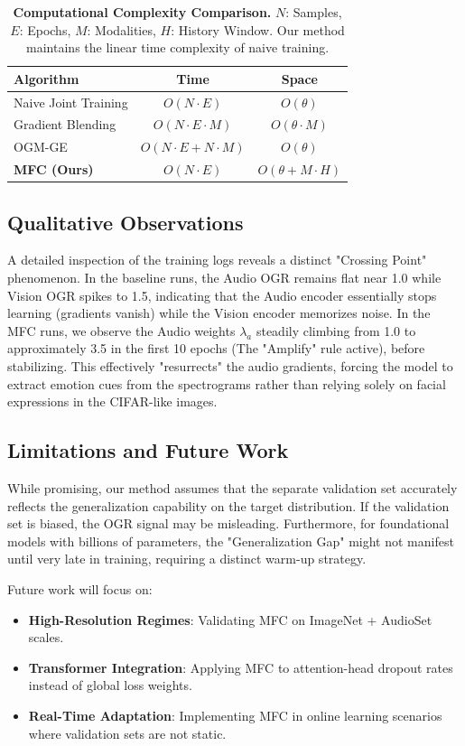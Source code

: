 \documentclass[10pt, twocolumn, letterpaper]{article}
\begin{document}
\begin{table}[h]
\centering
\begin{tabularx}{\columnwidth}{@{}Xcc@{}}
\toprule
\textbf{Algorithm} & \textbf{Time} & \textbf{Space} \\ \midrule
Naive Joint Training & $O(N \cdot E)$ & $O(\theta)$ \\
Gradient Blending & $O(N \cdot E \cdot M)$ & $O(\theta \cdot M)$ \\
OGM-GE & $O(N \cdot E + N \cdot M)$ & $O(\theta)$ \\
\textbf{MFC (Ours)} & $O(N \cdot E)$ & $O(\theta + M \cdot H)$ \\ \bottomrule
\end{tabularx}
\caption{\textbf{Computational Complexity Comparison.} $N$: Samples, $E$: Epochs, $M$: Modalities, $H$: History Window. Our method maintains the linear time complexity of naive training.}
\label{tab:complexity}
\end{table}

\subsection{Qualitative Observations}
A detailed inspection of the training logs reveals a distinct "Crossing Point" phenomenon. In the baseline runs, the Audio OGR remains flat near 1.0 while Vision OGR spikes to 1.5, indicating that the Audio encoder essentially stops learning (gradients vanish) while the Vision encoder memorizes noise. In the MFC runs, we observe the Audio weights $\lambda_a$ steadily climbing from 1.0 to approximately 3.5 in the first 10 epochs (The "Amplify" rule active), before stabilizing. This effectively "resurrects" the audio gradients, forcing the model to extract emotion cues from the spectrograms rather than relying solely on facial expressions in the CIFAR-like images.

\subsection{Limitations and Future Work}
While promising, our method assumes that the separate validation set accurately reflects the generalization capability on the target distribution. If the validation set is biased, the OGR signal may be misleading. Furthermore, for foundational models with billions of parameters, the "Generalization Gap" might not manifest until very late in training, requiring a distinct warm-up strategy.

Future work will focus on:
\begin{itemize}
    \item \textbf{High-Resolution Regimes}: Validating MFC on ImageNet + AudioSet \cite{audioset} scales.
    \item \textbf{Transformer Integration}: Applying MFC to attention-head dropout rates instead of global loss weights.
    \item \textbf{Real-Time Adaptation}: Implementing MFC in online learning scenarios where validation sets are not static.
\end{itemize}
\end{document}
